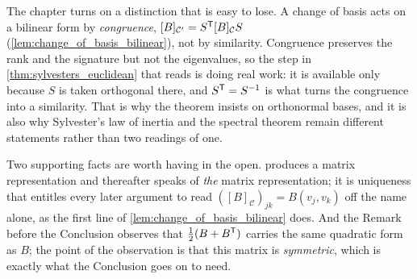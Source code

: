 
\begin{ainote}
The chapter turns on a distinction that is easy to lose. A change of basis acts
on a bilinear form by \emph{congruence},
$[B]_{\mathcal{C}'} = S^{\mathsf{T}} [B]_{\mathcal{C}} S$
(\cref{lem:change_of_basis_bilinear}), not by similarity. Congruence preserves
the rank and the signature but not the eigenvalues, so the step in
\cref{thm:sylvesters_euclidean} that reads  is doing real work: it is available only because $S$ is taken
orthogonal there, and $S^{\mathsf{T}} = S^{-1}$ is what turns the congruence into a
similarity. That is why the theorem insists on orthonormal bases, and it is also
why Sylvester's law of inertia and the spectral theorem remain different
statements rather than two readings of one.

Two supporting facts are worth having in the open.
 produces a matrix representation and
thereafter speaks of \emph{the} matrix representation; it is uniqueness that
entitles every later argument to read $([B]_{\mathcal{C}})_{jk} = B(v_j, v_k)$
off the name alone, as the first line of \cref{lem:change_of_basis_bilinear}
does. And the Remark before the Conclusion observes that
$\frac{1}{2}(B + B^{\mathsf{T}})$ carries the same quadratic form as $B$; the point of
the observation is that this matrix is \emph{symmetric}, which is exactly what
the Conclusion goes on to need.
\end{ainote}


